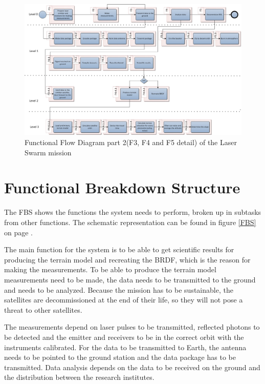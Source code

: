 \begin{landscape}
\begin{figure}[ht!]
\centering
\includegraphics[width=1.3\textheight]{chapters/img/FFD2.jpg}
\caption{Functional Flow Diagram part 2(F3, F4 and F5 detail) of the Laser Swarm mission}
\label{FFD2}
\end{figure}
\end{landscape}

\section{Functional Breakdown Structure}
\label{section_FBS}
The \ac{FBS} shows the functions the system needs to perform, broken up in subtasks from other functions. The schematic representation can be found in figure \ref{FBS} on page \pageref{FBS}.

The main function for the system is to be able to get scientific results for producing the terrain model and recreating the \acs{BRDF}, which is the reason for making the measurements. To be able to produce the terrain model measurements need to be made, the data needs to be transmitted to the ground and needs to be analyzed. Because the mission has to be sustainable, the satellites are decommissioned at the end of their life, so they will not pose a threat to other satellites.


The measurements depend on laser pulses to be transmitted, reflected photons to be detected and the emitter and receivers to be in the correct orbit with the instruments calibrated. For the data to be transmitted to Earth, the antenna needs to be pointed to the ground station and the data package has to be transmitted. Data analysis depends on the data to be received on the ground and the distribution between the research institutes.

